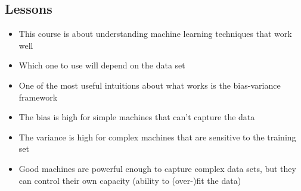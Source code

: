 
\begin{slide}
\section[-2]{Lessons}

\begin{PauseHighLight}
  \begin{itemize}
  \item This course is about understanding machine learning techniques that
    work well\pause
  \item Which one to use will depend on the data set\pause
  \item One of the most useful intuitions about what works is the
    bias-variance framework\pause
  \item The bias is high for simple machines that can't capture the
    data\pause
  \item The variance is high for complex machines that are sensitive
    to the training set\pause
  \item Good machines are powerful enough to capture complex data sets,
    but they can control their own capacity (ability to (over-)fit the
    data)\pause
  \end{itemize}
\end{PauseHighLight}

\end{slide}


